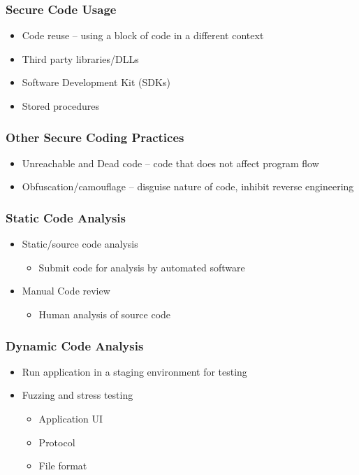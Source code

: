 		\subsubsection {Secure Code Usage}
			\begin{itemize}
				\item Code reuse -- using a block of code in a different context
				\item Third party libraries/DLLs
				\item Software Development Kit (SDKs)
				\item Stored procedures
			\end{itemize}
		\subsubsection {Other Secure Coding Practices}
			\begin{itemize}
				\item Unreachable and Dead code -- code that does not affect program flow
				\item Obfuscation/camouflage -- disguise nature of code, inhibit
					reverse engineering
			\end{itemize}
		\subsubsection {Static Code Analysis}
			\begin{itemize}
				\item Static/source code analysis
					\begin{itemize}
						\item Submit code for analysis by automated software
					\end{itemize}
				\item Manual Code review
					\begin{itemize}
						\item Human analysis of source code
					\end{itemize}
			\end{itemize}
		\subsubsection {Dynamic Code Analysis}
			\begin{itemize}
				\item Run application in a staging environment for testing
				\item Fuzzing and stress testing
					\begin{itemize}
						\item Application UI
						\item Protocol
						\item File format
					\end{itemize}
			\end{itemize}
